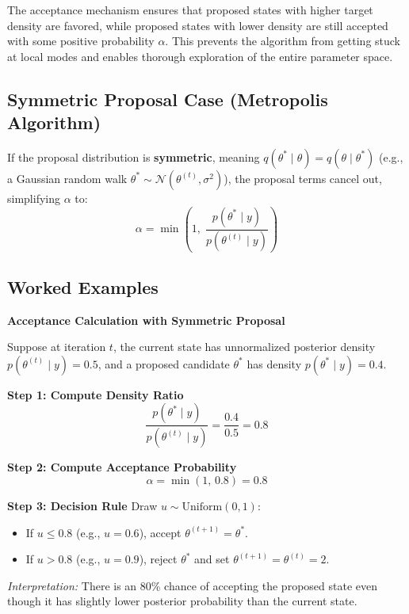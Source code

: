 \documentclass[12pt,a4paper]{article}
\begin{document}
\begin{keyidea}
The acceptance mechanism ensures that proposed states with higher target density are favored, while proposed states with lower density are still accepted with some positive probability $\alpha$. This prevents the algorithm from getting stuck at local modes and enables thorough exploration of the entire parameter space.
\end{keyidea}

\subsection{Symmetric Proposal Case (Metropolis Algorithm)}

If the proposal distribution is \textbf{symmetric}, meaning $q(\theta^* \mid \theta) = q(\theta \mid \theta^*)$ (e.g., a Gaussian random walk $\theta^* \sim \mathcal{N}(\theta^{(t)}, \sigma^2)$), the proposal terms cancel out, simplifying $\alpha$ to:
\[
\alpha = \min\left(1, \; \frac{p(\theta^* \mid y)}{p(\theta^{(t)} \mid y)}\right)
\]

\subsection{Worked Examples}

\begin{example}
\textbf{Acceptance Calculation with Symmetric Proposal}

Suppose at iteration $t$, the current state has unnormalized posterior density $p(\theta^{(t)} \mid y) = 0.5$, and a proposed candidate $\theta^*$ has density $p(\theta^* \mid y) = 0.4$.

\textbf{Step 1: Compute Density Ratio}
\[
\frac{p(\theta^* \mid y)}{p(\theta^{(t)} \mid y)} = \frac{0.4}{0.5} = 0.8
\]

\textbf{Step 2: Compute Acceptance Probability}
\[
\alpha = \min(1, \, 0.8) = 0.8
\]

\textbf{Step 3: Decision Rule}
Draw $u \sim \text{Uniform}(0,1)$:
\begin{itemize}[leftmargin=1.5em]
    \item If $u \le 0.8$ (e.g., $u = 0.6$), accept $\theta^{(t+1)} = \theta^*$.
    \item If $u > 0.8$ (e.g., $u = 0.9$), reject $\theta^*$ and set $\theta^{(t+1)} = \theta^{(t)} = 2$.
\end{itemize}
\textit{Interpretation:} There is an 80\% chance of accepting the proposed state even though it has slightly lower posterior probability than the current state.
\end{example}
\end{document}
